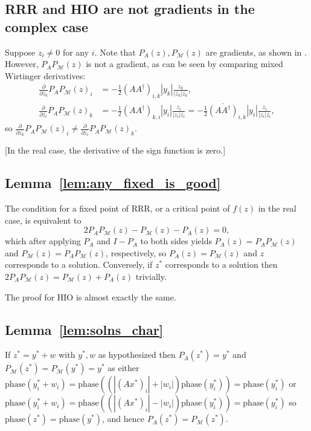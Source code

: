 \documentclass[12pt]{article}
\theoremstyle{definition}
\theoremstyle{remark}
\theoremstyle{definition}
\theoremstyle{problem}
\theoremstyle{definition}
\newcommand{\phase}{\text{phase}}
\newcommand{\MM}{\mathcal{M}}
\begin{document}
\subsection{RRR and HIO are not gradients in the complex case}\label{sec:complex_not_grads}
Suppose $z_i\neq 0$ for any $i$. Note that $P_A(z),P_{\MM}(z)$ are gradients, as shown in \cite{Marchesini2007}. However, $P_AP_{\MM}(z)$ is not a gradient, as can be seen by comparing mixed Wirtinger derivatives:
\[\begin{aligned} \frac{\partial}{\partial \overline{z_k}}P_AP_{\MM}(z)_i &= -\frac{1}{2}(AA^{\dagger})_{i,k}|y_k|\frac{z_k}{|z_k|\overline{z_k}},\\
\frac{\partial}{\partial \overline{z_i}}P_AP_{\MM}(z)_k &= -\frac{1}{2}(AA^{\dagger})_{k,i}|y_i|\frac{z_i}{|z_i|\overline{z_i}} = -\frac{1}{2}\overline{(AA^{\dagger})}_{i,k}|y_i|\frac{z_i}{|z_i|\overline{z_i}},\end{aligned}\]
so $\frac{\partial}{\partial \overline{z_k}}P_AP_{\MM}(z)_i\neq \frac{\partial}{\partial \overline{z_i}}P_AP_{\MM}(z)_k$. 

[In the real case, the derivative of the sign function is zero.]

\subsection{Lemma~\ref{lem:any_fixed_is_good}}\label{sec:pf_any_fixed_good}
The condition for a fixed point of RRR, or a critical point of $f(z)$ in the real case, is equivalent to
\[ 2P_AP_{\MM}(z) - P_{\MM}(z) - P_A(z) = 0,\]
which after applying $P_A$ and $I-P_A$ to both sides yields $P_A(z) = P_AP_{\MM}(z)$ and $P_{\MM}(z) = P_AP_{\MM}(z)$, respectively, so $P_A(z)=P_{\MM}(z)$ and $z$ corresponds to a solution. Conversely, if $z^*$ corresponds to a solution then $2P_AP_{\MM}(z) = P_{\MM}(z) + P_A(z)$ trivially.

The proof for HIO is almost exactly the same.

\subsection{Lemma~\ref{lem:solns_char}}\label{sec:pf_solns_char}
If $z^* = y^*+w$ with $y^*,w$ as hypothesized then $P_A(z^*)=y^*$ and $P_{\MM}(z^*) = P_{\MM}(y^*)=y^*$ as either $\phase(y^*_i+w_i) = \phase((|(Ax^*)_i|+|w_i|)\phase(y^*_i))=\phase(y^*_i)$ or $\phase(y^*_i+w_i) = \phase((|(Ax^*)_i|-|w_i|)\phase(y^*_i))=\phase(y^*_i)$ so $\phase(z^*)=\phase(y^*)$, and hence $P_A(z^*)=P_{\MM}(z^*)$.
\end{document}
